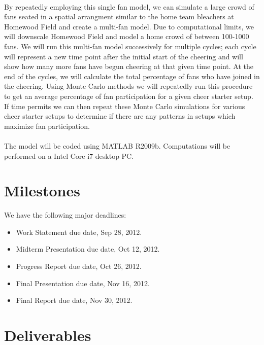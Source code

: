 \documentclass[12pt,letterpaper]{article}
\theoremstyle{definition}
\begin{document}
\paragraph{}
By repeatedly employing this single fan model, we can simulate a large crowd of fans seated in a spatial arrangment similar to the home team bleachers at Homewood Field and create a multi-fan model. Due to computational limits, we will downscale Homewood Field and model a home crowd of between 100-1000 fans. We will run this multi-fan model successively for multiple cycles; each cycle will represent a new time point after the initial start of the cheering and will show how many more fans have begun cheering at that given time point. At the end of the cycles, we will calculate the total percentage of fans who have joined in the cheering. Using Monte Carlo methods we will repeatedly run this procedure to get an average percentage of fan participation for a given cheer starter setup. If time permits we can then repeat these Monte Carlo simulations for various cheer starter setups to determine if there are any patterns in setups which maximize fan participation. 
\paragraph{}
The model will be coded using MATLAB R2009b. Computations will be performed on a Intel Core i7 desktop PC. 

\section{Milestones}
We have the following major deadlines:
\begin{itemize}
    \item Work Statement due date, Sep 28, 2012.
    \item Midterm Presentation due date, Oct 12, 2012.
    \item Progress Report due date, Oct 26, 2012.
    \item Final Presentation due date, Nov 16, 2012.
    \item Final Report due date, Nov 30, 2012.
\end{itemize}

\section{Deliverables}
\end{document}
